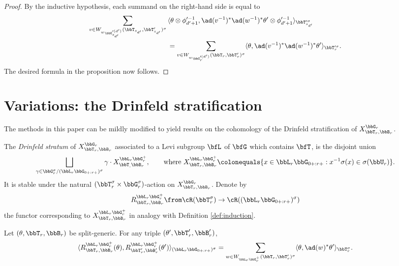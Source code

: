 \begin{proof}
  By the inductive hypothesis, each summand on the right-hand side is equal to
  \begin{align*}
    \sum_{v \in W_{{}^w \bbG_{s_{d'}}^{\prime (d')}}(\bbT_{s_{d'}},\bbT_{s_{d'}}')^\sigma} {}&{} \langle \theta \otimes \phi_{d'+1}^{\prime-1}, \ad(v^{-1})^* \ad(w^{-1})^* \theta' \otimes \phi_{d'+1}^{\prime-1} \rangle_{\bbT_{s_{d'}}^{\prime\sigma}} \\
    &= \sum_{v \in W_{{}^w \bbG_r^{\prime(d')}}(\bbT_r,\bbT_r')^\sigma} \langle \theta, \ad(v^{-1})^* \ad(w^{-1})^* \theta' \rangle_{\bbT_r^{\prime\sigma}}.
  \end{align*}
  The desired formula in the proposition now follows.
\end{proof}

\section{Variations: the Drinfeld stratification}\label{sec:drinfeld}

The methods in this paper can be mildly modified to yield results on the cohomology of the Drinfeld stratification of $X_{\bbT_r,\bbB_r}^{\bbG_r}$.

\begin{definition}\label{def:drinfeld}
  The \textit{Drinfeld stratum} of $X_{\bbT_r,\bbB_r}^{\bbG_r}$ associated to a Levi subgroup $\bfL$ of $\bfG$ which contains $\bfT$, is the disjoint union
  \begin{equation*}
    \bigsqcup_{\gamma \in \bbG_r^\sigma/(\bbL_r \bbG_{0+:r+})^\sigma} \gamma \cdot X_{\bbT_,\bbB_r}^{\bbL_r\bbG_r^+}, \qquad \text{where $X_{\bbT_r,\bbB_r}^{\bbL_r\bbG_r^+} \colonequals \{x \in \bbL_r \bbG_{0+:r+} : x^{-1}\sigma(x) \in \sigma(\bbU_r)\}$}.
  \end{equation*}
  It is stable under the natural $(\bbT_r^\sigma \times \bbG_r^\sigma)$-action on $X_{\bbT_r,\bbB_r}^{\bbG_r}$. Denote by 
  \begin{equation*}
    R_{\bbT_r,\bbB_r}^{\bbL_r\bbG_r^+} \from \cR(\bbT_r^\sigma) \to \cR((\bbL_r\bbG_{0+:r+})^\sigma)
  \end{equation*}
  the functor corresponding to $X_{\bbT_r,\bbB_r}^{\bbL_r\bbG_r^+}$ in analogy with Definition \ref{def:induction}.
\end{definition}

\begin{theorem}\label{thm:drinfeld}
  Let $(\theta,\bbT_r,\bbB_r)$ be split-generic. For any triple $(\theta',\bbT_r',\bbB_r')$,
  \begin{equation*}
    \langle R_{\bbT_r,\bbB_r}^{\bbL_r\bbG_r^+}(\theta), R_{\bbT_r',\bbB_r'}^{\bbL_r\bbG_r^+}(\theta') \rangle_{(\bbL_r\bbG_{0+:r+})^\sigma} = \sum_{w \in W_{\bbL_r\bbG_r^+}(\bbT_r,\bbT_r')^\sigma} \langle \theta, \ad(w)^* \theta' \rangle_{\bbT_r^\sigma}.
  \end{equation*}
\end{theorem}

